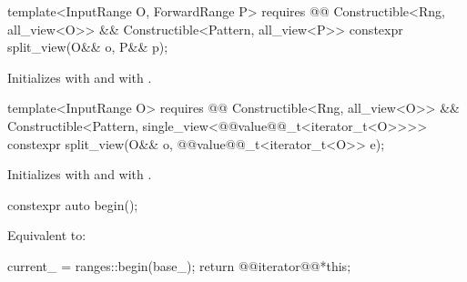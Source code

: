 {%
\begin{itemdecl}
template<InputRange O, ForwardRange P>
  requires @@
    Constructible<Rng, all_view<O>> &&
    Constructible<Pattern, all_view<P>>
constexpr split_view(O&& o, P&& p);
\end{itemdecl}

\begin{itemdescr}
\pnum
\effects
{\color{newclr}
Initializes  with  and
 with .
} %

\end{itemdescr}

%
\begin{itemdecl}
template<InputRange O>
  requires @@
    Constructible<Rng, all_view<O>> &&
    Constructible<Pattern, single_view<@@value@@_t<iterator_t<O>>>>
constexpr split_view(O&& o, @@value@@_t<iterator_t<O>> e);
\end{itemdecl}

\begin{itemdescr}
\pnum
\effects
{\color{newclr}
Initializes  with  and
 with .
} %

\end{itemdescr}

%
\begin{itemdecl}
constexpr auto begin();
\end{itemdecl}

\begin{itemdescr}
\pnum
\effects Equivalent to:
\begin{codeblock}
current_ = ranges::begin(base_);
return @@iterator@@{*this};
\end{codeblock}
\end{itemdescr}

}
